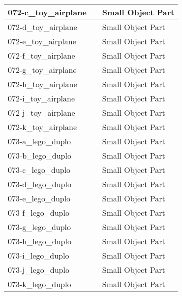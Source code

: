 \documentclass{article}
\begin{document}
\begin{longtable}{|l|l|l|}
072-c\_toy\_airplane         &                & Small Object Part                     \\ \hline
072-d\_toy\_airplane         &                & Small Object Part                     \\ \hline
072-e\_toy\_airplane         &                & Small Object Part                     \\ \hline
072-f\_toy\_airplane         &                & Small Object Part                     \\ \hline
072-g\_toy\_airplane         &                & Small Object Part                     \\ \hline
072-h\_toy\_airplane         &                & Small Object Part                     \\ \hline
072-i\_toy\_airplane         &                & Small Object Part                     \\ \hline
072-j\_toy\_airplane         &                & Small Object Part                     \\ \hline
072-k\_toy\_airplane         &                & Small Object Part                     \\ \hline
073-a\_lego\_duplo           &                & Small Object Part                     \\ \hline
073-b\_lego\_duplo           &                & Small Object Part                     \\ \hline
073-c\_lego\_duplo           &                & Small Object Part                     \\ \hline
073-d\_lego\_duplo           &                & Small Object Part                     \\ \hline
073-e\_lego\_duplo           &                & Small Object Part                     \\ \hline
073-f\_lego\_duplo           &                & Small Object Part                     \\ \hline
073-g\_lego\_duplo           &                & Small Object Part                     \\ \hline
073-h\_lego\_duplo           &                & Small Object Part                     \\ \hline
073-i\_lego\_duplo           &                & Small Object Part                     \\ \hline
073-j\_lego\_duplo           &                & Small Object Part                     \\ \hline
073-k\_lego\_duplo           &                & Small Object Part                     \\ \hline

\end{longtable}
\end{document}
